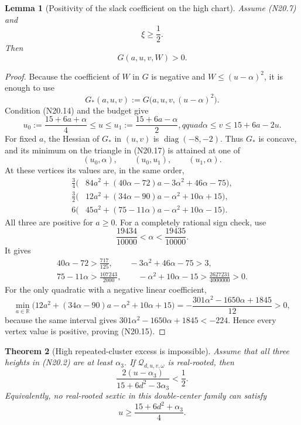 \documentclass[11pt]{article}
\newtheorem{theorem}{Theorem}[section]
\newtheorem{lemma}[theorem]{Lemma}
\theoremstyle{definition}
\theoremstyle{remark}
\begin{document}
\begin{lemma}[Positivity of the slack coefficient on the high chart]
\label{lem:f2v20-G-positive}
Assume \textup{(N20.7)} and
\[
 \xi\geq\frac12.
 \tag{N20.14}
\]
Then
\[
 G(a,u,v,W)>0.
 \tag{N20.15}
\]
\end{lemma}

\begin{proof}
Because the coefficient of \(W\) in \(G\) is negative and
\(W\leq(u-\alpha)^2\), it is enough to use
\[
 G_*(a,u,v):=G\bigl(a,u,v,(u-\alpha)^2\bigr).
 \tag{N20.16}
\]
Condition \textup{(N20.14)} and the budget give
\[
 u_0:=\frac{15+6a+\alpha}{4}\leq u\leq
 u_1:=\frac{15+6a-\alpha}{2},qquad
 \alpha\leq v\leq15+6a-2u.
 \tag{N20.17}
\]
For fixed \(a\), the Hessian of \(G_*\) in \((u,v)\) is
\(\operatorname{diag}(-8,-2)\).  Thus \(G_*\) is concave, and its minimum
on the triangle in \textup{(N20.17)} is attained at one of
\[
 (u_0,\alpha),\qquad (u_0,u_1),\qquad (u_1,\alpha).
 \tag{N20.18}
\]
At these vertices its values are, in the same order,
\begin{align}
 \frac34\bigl(&84a^2+(40\alpha-72)a-3\alpha^2+46\alpha-75\bigr),
 \tag{N20.19}\\
 \frac32\bigl(&12a^2+(34\alpha-90)a-\alpha^2+10\alpha+15\bigr),
 \tag{N20.20}\\
 6\bigl(&45a^2+(75-11\alpha)a-\alpha^2+10\alpha-15\bigr).
 \tag{N20.21}
\end{align}
All three are positive for \(a\geq0\).  For a completely rational sign
check, use
\[
 \frac{19434}{10000}<\alpha<\frac{19435}{10000}.
 \tag{N20.22}
\]
It gives
\[
\begin{gathered}
 40\alpha-72>\frac{717}{125},\qquad
 -3\alpha^2+46\alpha-75>3,\\
 75-11\alpha>\frac{107243}{2000},\qquad
 -\alpha^2+10\alpha-15>\frac{2627231}{4000000}>0.
 \tag{N20.23}
\end{gathered}
\]
For the only quadratic with a negative linear coefficient,
\[
 \min_{a\in\mathbb R}
 \bigl(12a^2+(34\alpha-90)a-\alpha^2+10\alpha+15\bigr)
 =-\frac{301\alpha^2-1650\alpha+1845}{12}>0,
 \tag{N20.24}
\]
because the same interval gives
\(301\alpha^2-1650\alpha+1845<-224\).  Hence every vertex value is
positive, proving \textup{(N20.15)}.
\end{proof}

\begin{theorem}[High repeated-cluster excess is impossible]
\label{thm:f2v20-high-excess}
Assume that all three heights in \textup{(N20.2)} are at least
\(\alpha_3\).  If \(\mathcal Q_{d,u,v,\omega}\) is real-rooted, then
\[
 \frac{2(u-\alpha_3)}{15+6d^2-3\alpha_3}<\frac12.
 \tag{N20.25}
\]
Equivalently, no real-rooted sextic in this double-center family can satisfy
\[
 u\geq\frac{15+6d^2+\alpha_3}{4}.
 \tag{N20.26}
\]
\end{theorem}
\end{document}
